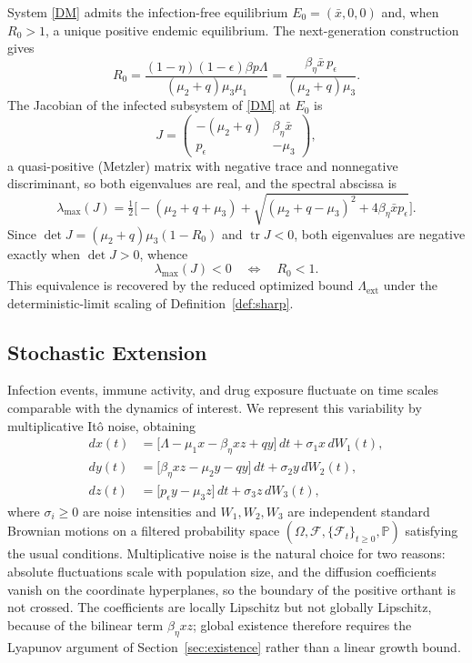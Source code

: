 \documentclass{article}
\newcommand{\betaeta}{\beta_\eta}
\newcommand{\peps}{p_\epsilon}
\newcommand{\Rz}{R_0}
\newcommand{\Lext}{\Lambda_{\mathrm{ext}}}
\begin{document}
System \eqref{DM} admits the infection-free equilibrium $E_0=(\bar x,0,0)$ and, when $\Rz>1$, a unique positive endemic equilibrium. The next-generation construction \citep{Ref31} gives
\begin{equation}\label{R0}
\Rz = \frac{(1-\eta)(1-\epsilon)\beta p \Lambda}{(\mu_2+q)\mu_3 \mu_1} = \frac{\betaeta\bar x\,\peps}{(\mu_2+q)\mu_3}.
\end{equation}
The Jacobian of the infected subsystem of \eqref{DM} at $E_0$ is
\begin{equation}\label{eq:Jmat}
J=\begin{pmatrix} -(\mu_2+q) & \betaeta\bar x\\[2pt] \peps & -\mu_3\end{pmatrix},
\end{equation}
a quasi-positive (Metzler) matrix with negative trace and nonnegative discriminant, so both eigenvalues are real, and the spectral abscissa is
\begin{equation}\label{eq:lammax}
\lambda_{\max}(J)=\tfrac12\Big[-(\mu_2+q+\mu_3)+\sqrt{(\mu_2+q-\mu_3)^2+4\betaeta\bar x\peps}\Big].
\end{equation}
Since $\det J=(\mu_2+q)\mu_3(1-\Rz)$ and $\operatorname{tr}J<0$, both eigenvalues are negative exactly when $\det J>0$, whence
\begin{equation}\label{eq:lamR0}
\lambda_{\max}(J)<0\quad\Longleftrightarrow\quad \Rz<1 .
\end{equation}
This equivalence is recovered by the reduced optimized bound $\Lext$ under the deterministic-limit scaling of Definition~\ref{def:sharp}.

\subsection{Stochastic Extension}

Infection events, immune activity, and drug exposure fluctuate on time scales comparable with the dynamics of interest. We represent this variability by multiplicative It\^o noise, obtaining
\begin{equation}\label{SM}
\begin{split}
dx(t) &= \big[\Lambda - \mu_1 x - \betaeta xz + qy\big]\,dt + \sigma_1 x \, dW_1(t), \\
dy(t) &= \big[\betaeta xz - \mu_2 y - qy\big]\,dt + \sigma_2 y \, dW_2(t), \\
dz(t) &= \big[\peps y - \mu_3 z\big]\,dt + \sigma_3 z \, dW_3(t),
\end{split}
\end{equation}
where $\sigma_i\ge0$ are noise intensities and $W_1,W_2,W_3$ are independent standard Brownian motions on a filtered probability space $(\Omega,\mathcal{F},\{\mathcal{F}_t\}_{t\ge0},\mathbb{P})$ satisfying the usual conditions. Multiplicative noise is the natural choice for two reasons: absolute fluctuations scale with population size, and the diffusion coefficients vanish on the coordinate hyperplanes, so the boundary of the positive orthant is not crossed. The coefficients are locally Lipschitz but not globally Lipschitz, because of the bilinear term $\betaeta xz$; global existence therefore requires the Lyapunov argument of Section~\ref{sec:existence} rather than a linear growth bound.
\end{document}
